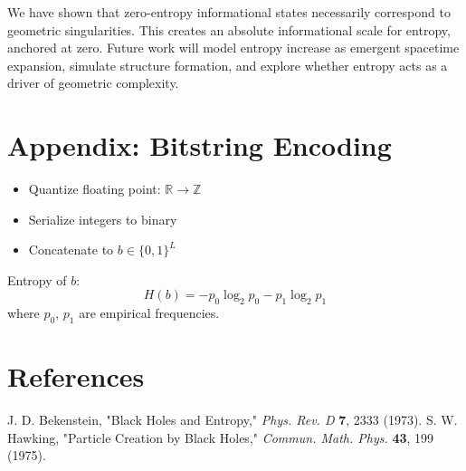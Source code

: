 \documentclass[11pt]{article}
\begin{document}
We have shown that zero-entropy informational states necessarily correspond to geometric singularities. This creates an absolute informational scale for entropy, anchored at zero. Future work will model entropy increase as emergent spacetime expansion, simulate structure formation, and explore whether entropy acts as a driver of geometric complexity.

\appendix
\section{Appendix: Bitstring Encoding}

\begin{itemize}
  \item Quantize floating point: $\mathbb{R} \to \mathbb{Z}$
  \item Serialize integers to binary
  \item Concatenate to $b \in \{0,1\}^L$
\end{itemize}

Entropy of $b$:
\[
  H(b) = -p_0 \log_2 p_0 - p_1 \log_2 p_1
\]
where $p_0$, $p_1$ are empirical frequencies.

\section*{References}
\begin{thebibliography}{9}
   J. D. Bekenstein, "Black Holes and Entropy," \textit{Phys. Rev. D} \textbf{7}, 2333 (1973).
   S. W. Hawking, "Particle Creation by Black Holes," \textit{Commun. Math. Phys.} \textbf{43}, 199 (1975).
\end{thebibliography}
\end{document}
